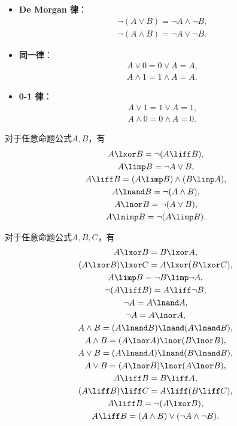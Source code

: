\begin{theorem}
\begin{itemize}
	\item {\rm\bf De Morgan 律}：\begin{gather}
		\neg(A \lor B) = \neg A \land \neg B, \\
		\neg(A \land B) = \neg A \lor \neg B.
	\end{gather}

	\item {\rm\bf 同一律}：\begin{gather}
		A \lor 0 = 0 \lor A = A, \\
		A \land 1 = 1 \land A = A.
	\end{gather}

	\item {\rm\bf 0-1 律}：\begin{gather}
		A \lor 1 = 1 \lor A = 1, \\
		A \land 0 = 0 \land A = 0.
	\end{gather}
\end{itemize}
\end{theorem}

\begin{theorem}
对于任意命题公式\(A,B\)，有\begin{gather}
	A \lxor B
	= \neg(A \liff B), \\
	A \limp B
	= \neg A \lor B, \\
	A \liff B
	= (A \limp B) \land (B \limp A), \\
	A \lnand B
	= \neg(A \land B), \\
	A \lnor B
	= \neg(A \lor B), \\
	A \lnimp B
	= \neg(A \limp B).
\end{gather}
\end{theorem}

\begin{theorem}
对于任意命题公式\(A,B,C\)，有\begin{gather}
	A \lxor B = B \lxor A, \\
	(A \lxor B) \lxor C = A \lxor (B \lxor C), \\
	A \limp B = \neg B \limp \neg A, \\
	\neg(A \liff B) = A \liff \neg B, \\
	\neg A = A \lnand A, \\
	\neg A = A \lnor A, \\
	A \land B = (A \lnand B) \lnand (A \lnand B), \\
	A \land B = (A \lnor A) \lnor (B \lnor B), \\
	A \lor B = (A \lnand A) \lnand (B \lnand B), \\
	A \lor B = (A \lnor B) \lnor (A \lnor B), \\
	A \liff B = B \liff A, \\
	(A \liff B) \liff C = A \liff (B \liff C), \\
	A \liff B = \neg(A \lxor B), \\
	A \liff B = (A \land B) \lor (\neg A \land \neg B).
\end{gather}
\end{theorem}

